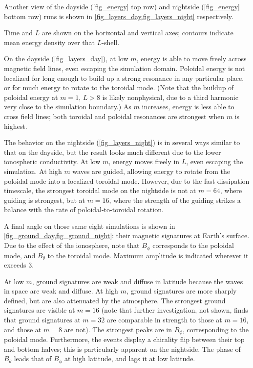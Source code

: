 \documentclass{article}
\newcommand{\azm}{\ensuremath{m}\xspace}
\begin{document}
Another view of the dayside (\cref{fig_energy} top row) and nightside (\cref{fig_energy} bottom row) runs is shown in \cref{fig_layers_day,fig_layers_night} respectively.

Time and $L$ are shown on the horizontal and vertical axes; contours indicate mean energy density over that $L$-shell.

On the dayside (\cref{fig_layers_day}), at low \azm, energy is able to move freely across magnetic field lines, even escaping the simulation domain. Poloidal energy is not localized for long enough to build up a strong resonance in any particular place, or for much energy to rotate to the toroidal mode. (Note that the buildup of poloidal energy at $\azm = 1$, $L > 8$ is likely nonphysical, due to a third harmonic very close to the simulation boundary.) As \azm increases, energy is less able to cross field lines; both toroidal and poloidal resonances are strongest when \azm is highest.

The behavior on the nightside (\cref{fig_layers_night}) is in several ways similar to that on the dayside, but the result looks much different due to the lower ionospheric conductivity. At low \azm, energy moves freely in $L$, even escaping the simulation. At high \azm waves are guided, allowing energy to rotate from the poloidal mode into a localized toroidal mode. However, due to the fast dissipation timescale, the strongest toroidal mode on the nightside is not at $\azm = 64$, where guiding is strongest, but at $\azm = 16$, where the strength of the guiding strikes a balance with the rate of poloidal-to-toroidal rotation.

A final angle on those same eight simulations is shown in \cref{fig_ground_day,fig_ground_night}: their magnetic signatures at Earth's surface. Due to the effect of the ionosphere, note that $B_\phi$ corresponds to the poloidal mode, and $B_\theta$ to the toroidal mode. Maximum amplitude is indicated wherever it exceeds \SI{3}{\nT}.

At low \azm, ground signatures are weak and diffuse in latitude because the waves in space are weak and diffuse. At high \azm, ground signatures are more sharply defined, but are also attenuated by the atmosphere. The strongest ground signatures are visible at $\azm = 16$ (note that further investigation, not shown, finds that ground signatures at $\azm = 32$ are comparable in strength to those at $\azm = 16$, and those at $\azm = 8$ are not). The strongest peaks are in $B_\phi$, corresponding to the poloidal mode. Furthermore, the events display a chirality flip between their top and bottom halves; this is particularly apparent on the nightside. The phase of $B_\theta$ leads that of $B_\phi$ at high latitude, and lags it at low latitude.
\end{document}
